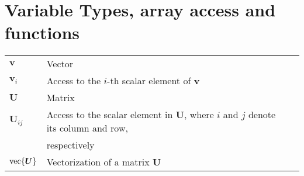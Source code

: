 \section*{Variable Types, array access and functions}
\begin{flushleft}
\normalsize
\begin{tabular}{l l l}
$\bm{v}$ & Vector\\
$\bm{v}_i$ & Access to the $i$-th scalar element of $\bm{v}$\\
$\bm{U}$ & Matrix \\
$\bm{U}_{ij} $ & Access to the scalar element in $\bm{U}$, where $i$ and $j$ denote its column and row, \\ & respectively \\ 
$\operatorname{vec} \{  \bm{U}  \}$ & Vectorization of a matrix $\bm{U}$\\
\end{tabular}
\end{flushleft}


